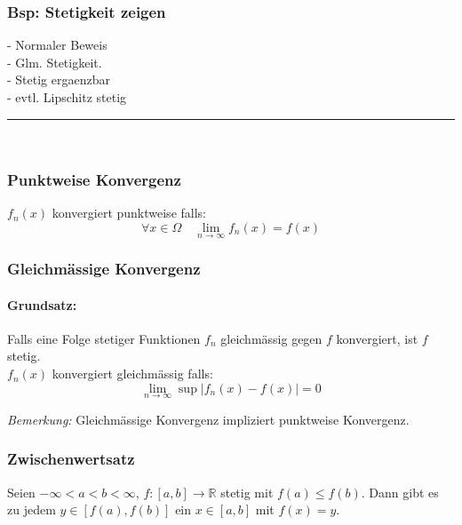 \documentclass[6pt]{article}
\begin{document}
\begin{multicols*}{3}
\subsubsection*{Bsp: Stetigkeit zeigen}
	- Normaler Beweis \\
	- Glm. Stetigkeit. \\
	- Stetig ergaenzbar \\
	- evtl. Lipschitz stetig \\
	






	\vspace{2mm}
  		\noindent\textcolor{gray}{\rule{9cm}{0.2pt}}
	\vspace{-8mm}\\

\subsubsection*{Punktweise Konvergenz}
$f_n(x)$ konvergiert punktweise falls:
\begin{equation*}
	\forall x\in \Omega \quad \lim_{n\rightarrow\infty}f_n(x) = f(x)
\end{equation*}

\subsubsection*{Gleichm{\"a}ssige Konvergenz}

\paragraph{Grundsatz:} Falls eine Folge stetiger Funktionen $f_n$ gleichm{\"a}ssig gegen $f$ konvergiert, ist $f$ stetig.\\

$f_n(x)$ konvergiert gleichm{\"a}ssig falls:
\begin{equation*}
	\lim_{n\rightarrow\infty} \sup|f_n(x) - f(x)| = 0
\end{equation*}

\emph{Bemerkung:} Gleichm{\"a}ssige Konvergenz impliziert punktweise Konvergenz.


\subsubsection*{Zwischenwertsatz}
	Seien $-\infty < a < b < \infty$, $f:[a,b] \to \mathbb{R}$ stetig mit $f(a) \leq f(b)$. Dann gibt es zu jedem $y \in [f(a), f(b)]$ ein $x \in [a,b]$ mit $f(x) = y$.
		

\end{multicols*}
\end{document}

